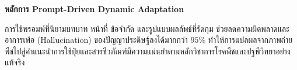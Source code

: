 \begin{theorybox}
\textbf{หลักการ Prompt-Driven Dynamic Adaptation}\par
การใช้พรอมพ์ที่นิยามบทบาท หน้าที่ ข้อจำกัด และรูปแบบผลลัพธ์ที่รัดกุม ช่วยลดความผิดพลาดและอาการเพ้อ (Hallucination) ของปัญญาประดิษฐ์ลงได้มากกว่า $95\%$ ทำให้การแปลผลจากภาพถ่ายพืชไปสู่คำแนะนำการใช้ปุ๋ยและสารชีวภัณฑ์มีความแม่นยำตามหลักวิชาการโรคพืชและปฐพีวิทยาอย่างแท้จริง
\end{theorybox}
